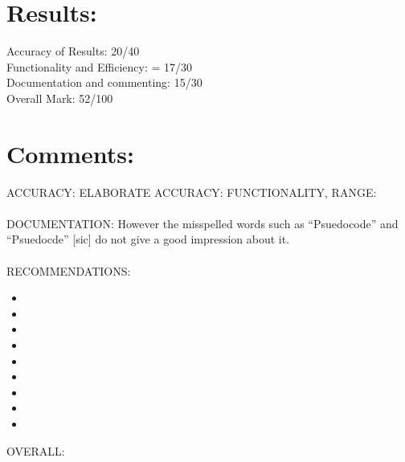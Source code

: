 \documentclass[11pt]{article} %
\begin{document}

\section{Results:}

Accuracy of Results: 20/40 \\
Functionality and Efficiency: = 17/30 \\ 
Documentation and commenting: 15/30 \\ 
Overall Mark: 52/100 \\

\section{Comments:}

ACCURACY:
ELABORATE ACCURACY:
FUNCTIONALITY, RANGE:
\\
\\ 
DOCUMENTATION:
However the misspelled words such as ``Psuedocode'' and ``Psuedocde'' [sic] do not give a good impression about it. \\
\\
RECOMMENDATIONS:
\begin{itemize}
\item {}
\item {}
\item {}
\item {}
\item {}
\item {}
\item {}
\item {}
\item {}
\end{itemize}
OVERALL: 
\end{document}
